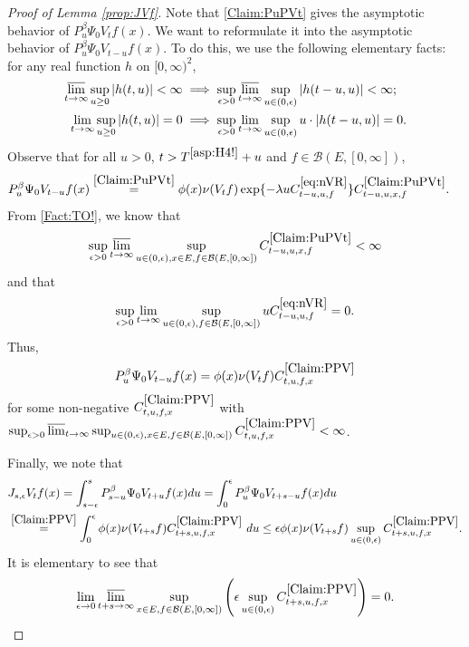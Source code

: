 \documentclass[12pt,a4paper]{amsart}
\numberwithin{equation}{section}
\theoremstyle{plain}
\theoremstyle{definition}
\theoremstyle{remark}
\begin{document}
\begin{proof}[Proof of Lemma \ref{prop:JVf}]
	Note that \eqref{Claim:PuPVt} gives the asymptotic behavior of $P_u^\beta \Psi_0 V_t f(x)$.
	We want to reformulate it into the asymptotic behavior  of $P_u^\beta \Psi_0 V_{t-u} f(x)$.	
	To do this, we use the following elementary facts: for any real function $h$ on $[0,\infty)^2$,
\begin{align}\label{Fact:TO!}
	\varlimsup_{t\to \infty} \sup_{u\geq 0} |h(t,u)| < \infty & \implies \sup_{\epsilon > 0} \varlimsup_{t\to \infty} \sup_{u \in (0,\epsilon)} |h(t-u,u)| < \infty;
	\\ 	\lim_{t\to \infty} \sup_{u \geq 0} |h(t,u)| = 0 & \implies \sup_{\epsilon > 0} \lim_{t\to \infty} \sup_{u \in (0,\epsilon)} u\cdot |h(t-u,u)| = 0.
\end{align}
	Observe that for all $u>0$, $t> T^{\eqref{asp:H4!}} + u$ and $f \in \mathcal B(E,[0,\infty])$,
\begin{align}
	& P_u^\beta \Psi_0 V_{t-u} f(x)
	\overset{\eqref{Claim:PuPVt}}= \phi(x) \nu(V_{t}f) \exp\{-\lambda u C^{\eqref{eq:nVR}}_{t-u,u,f} \} C^{\eqref{Claim:PuPVt}}_{t-u,u,x,f}.
\end{align}
	From \eqref{Fact:TO!}, we know that
\[
	\sup_{\epsilon > 0}\varlimsup_{t\to \infty}
	\sup_{u\in (0,\epsilon), x\in E, f \in \mathcal B(E,[0,\infty])}
	C^{\eqref{Claim:PuPVt}}_{t-u,u,x,f} < \infty
\]
	and that
\[
	\sup_{\epsilon > 0}\lim_{t\to \infty}
	\sup_{u\in (0,\epsilon), f \in \mathcal B(E,[0,\infty])}
	uC^{\eqref{eq:nVR}}_{t-u,u,f} =0.
\]
	Thus,
\begin{equation}
	\label{Claim:PPV}
	P_u^\beta \Psi_0 V_{t-u} f(x) = \phi(x)\nu(V_tf) C^{\eqref{Claim:PPV}}_{t,u,f,x}
\end{equation}
	for some non-negative $C^{\eqref{Claim:PPV}}_{t, u,f,x}$ with
	$\sup_{\epsilon > 0} \varlimsup_{t\to \infty}
	\sup_{u \in (0,\epsilon), x\in E, f \in \mathcal B(E,[0,\infty])}
	C^{\eqref{Claim:PPV}}_{t,u,f,x} < \infty$.

	Finally, we note that
\begin{align}
	&J_{s,\epsilon}V_tf(x) = \int_{s-\epsilon}^s P_{s-u}^\beta \Psi_0 V_{t+u} f(x)du
	= \int_0^\epsilon P_u^\beta \Psi_0 V_{t+s - u}f(x) du
	\\& \overset{\eqref{Claim:PPV}}= \int_0^\epsilon \phi(x) \nu(V_{t+s}f) C^{\eqref{Claim:PPV}}_{t+s,u,f,x}~du
	\leq \epsilon \phi(x)\nu(V_{t+s}f) \sup_{u\in (0,\epsilon)} C^{\eqref{Claim:PPV}}_{t+s,u,f,x}.
\end{align}
	It is elementary to see that \[\lim_{\epsilon \to 0}\varlimsup_{t+s \to \infty}
	\sup_{x\in E, f \in \mathcal B(E,[0,\infty])}
	\left(\epsilon \sup_{u\in (0,\epsilon)} C^{\eqref{Claim:PPV}}_{t+s,u,f,x}\right) = 0.\qedhere\]
\end{proof}
\end{document}
